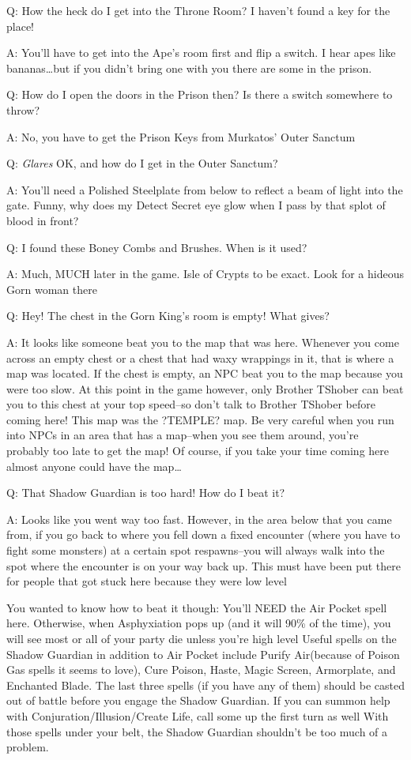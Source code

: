\documentclass[12pt]{article}
\begin{document}
Q: How the heck do I get into the Throne Room? I haven't found a key for
the place!

A: You'll have to get into the Ape's room first and flip a switch. I
hear apes like bananas\ldots{}but if you didn't bring one with you there
are some in the prison.

Q: How do I open the doors in the Prison then? Is there a switch
somewhere to throw?

A: No, you have to get the Prison Keys from Murkatos' Outer Sanctum

Q: \emph{Glares} OK, and how do I get in the Outer Sanctum?

A: You'll need a Polished Steelplate from below to reflect a beam of
light into the gate. Funny, why does my Detect Secret eye glow when I
pass by that splot of blood in front?

Q: I found these Boney Combs and Brushes. When is it used?

A: Much, MUCH later in the game. Isle of Crypts to be exact. Look for a
hideous Gorn woman there

Q: Hey! The chest in the Gorn King's room is empty! What gives?

A: It looks like someone beat you to the map that was here. Whenever you
come across an empty chest or a chest that had waxy wrappings in it,
that is where a map was located. If the chest is empty, an NPC beat you
to the map because you were too slow. At this point in the game however,
only Brother TShober can beat you to this chest at your top speed--so
don't talk to Brother TShober before coming here! This map was the
?TEMPLE? map. Be very careful when you run into NPCs in an area that has
a map--when you see them around, you're probably too late to get the
map! Of course, if you take your time coming here almost anyone could
have the map\ldots{}

Q: That Shadow Guardian is too hard! How do I beat it?

A: Looks like you went way too fast. However, in the area below that you
came from, if you go back to where you fell down a fixed encounter
(where you have to fight some monsters) at a certain spot respawns--you
will always walk into the spot where the encounter is on your way back
up. This must have been put there for people that got stuck here because
they were low level

You wanted to know how to beat it though: You'll \textsc{NEED} the Air Pocket
spell here.  Otherwise, when Asphyxiation pops up (and it will 90\% of the
time), you will see most or all of your party die unless you're high level
Useful spells on the Shadow Guardian in addition to Air Pocket include Purify
Air(because of Poison Gas spells it seems to love), Cure Poison, Haste, Magic
Screen, Armorplate, and Enchanted Blade.  The last three spells (if you have
any of them) should be casted out of battle before you engage the Shadow
Guardian.  If you can summon help with Conjuration/Illusion/Create Life, call
some up the first turn as well With those spells under your belt, the Shadow
Guardian shouldn't be too much of a problem.
\end{document}
